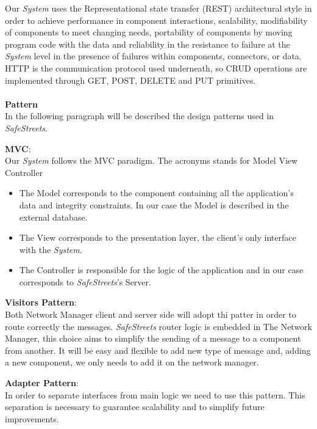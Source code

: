 \documentclass{article}
\begin{document}
Our \textit{System} uses the Representational state transfer (REST) architectural style in order to achieve 
performance in component interactions, scalability, modifiability of components to meet changing needs, portability 
of components by moving program code with the data and reliability in the resistance to failure at the \textit{System} level
in the presence of failures within components, connectors, or data. HTTP is the communication protocol used underneath, 
so CRUD operations are implemented through GET, POST, DELETE and PUT primitives.
\\
\\
\textbf{Pattern}\\
In the following paragraph will be described the design patterns used in \textit{SafeStreets}. 

\textbf{MVC}:\\
Our \textit{System} follows the MVC paradigm. The acronyms stands for Model View Controller

\begin{itemize}
    \item The Model corresponds to the component containing all the application's data and integrity constraints. 
    In our case the Model is described in the external database.
    \item The View corresponds to the presentation layer, the client's only interface with the \textit{System}.
    \item The Controller is responsible for the logic of the application and in our case corresponds to \textit{SafeStreets}'s Server.
\end{itemize}

\textbf{Visitors Pattern}:\\
Both Network Manager client and server side will adopt thi patter in order to route correctly the messages. \textit{SafeStreets}
router logic is embedded in The Network Manager, this choice aims to simplify the sending of a message to a component
from another. It will be easy and flexible to add new type of message and, adding a new component, we only needs to 
add it on the network manager.

\textbf{Adapter Pattern}:\\
In order to separate interfaces from main logic we need to use this pattern. This separation is necessary to guarantee
scalability and to simplify future improvements.

\clearpage
\end{document}
